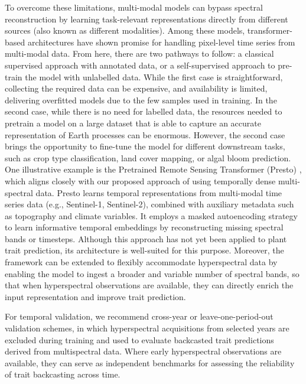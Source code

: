 \documentclass[pdflatex,sn-mathphys-num]{sn-jnl}%
\theoremstyle{thmstyleone}%
\theoremstyle{thmstyletwo}%
\theoremstyle{thmstylethree}%
\begin{document}
To overcome these limitations, multi-modal models can bypass spectral reconstruction by learning task-relevant representations directly from different sources (also known as different modalities). Among these models, transformer-based architectures have shown promise for handling pixel-level time series from multi-modal data. From here, there are two pathways to follow: a classical supervised approach with annotated data, or a self-supervised approach to pre-train the model with unlabelled data. While the first case is straightforward, collecting the required data can be expensive, and availability is limited, delivering overfitted models due to the few samples used in training. In the second case, while there is no need for labelled data, the resources needed to pretrain a model on a large dataset that is able to capture an accurate representation of Earth processes can be enormous. However, the second case brings the opportunity to fine-tune the model for different downstream tasks, such as crop type classification, land cover mapping, or algal bloom prediction. One illustrative example is the Pretrained Remote Sensing Transformer (Presto) \cite{tseng2023lightweight}, which aligns closely with our proposed approach of using temporally dense multi-spectral data. Presto learns temporal representations from multi-modal time series data (e.g., Sentinel-1, Sentinel-2), combined with auxiliary metadata such as topography and climate variables. It employs a masked autoencoding strategy to learn informative temporal embeddings by reconstructing missing spectral bands or timesteps. Although this approach has not yet been applied to plant trait prediction, its architecture is well-suited for this purpose. Moreover, the framework can be extended to flexibly accommodate hyperspectral data by enabling the model to ingest a broader and variable number of spectral bands, so that when hyperspectral observations are available, they can directly enrich the input representation and improve trait prediction.

For temporal validation, we recommend cross-year or leave-one-period-out validation schemes, in which hyperspectral acquisitions from selected years are excluded during training and used to evaluate backcasted trait predictions derived from multispectral data. Where early hyperspectral observations are available, they can serve as independent benchmarks for assessing the reliability of trait backcasting across time.


\end{document}
